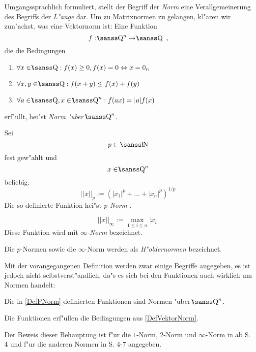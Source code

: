 Umgangssprachlich formuliert, stellt der Begriff der {\em Norm} eine 
Verallgemeinerung des Begriffs der {\em L"ange} dar. Um zu Matrixnormen 
zu gelangen, kl"aren wir zun"achst, was eine Vektornorm ist:
\MyBeginDef
{}
\label{DefVektorNorm}
    Eine Funktion
    \[ f: \Rationals^n \rightarrow \Rationals \MyKomma \]
    die die Bedingungen
    \begin{enumerate} %
    \item
         $ \forall x \in \Rationals: f(x) \geq 0, 
            f(x) = 0 \Leftrightarrow x = 0_n 
         $
    \item
         $ \forall x,y \in \Rationals: f(x + y) \leq f(x) + f(y) $
    \item
         $ \forall a \in \Rationals, x \in \Rationals^n: f(ax)= |a| f(x) $
    \end{enumerate}
    erf"ullt, hei"st {\em Norm "uber $\Rationals^n$}. 
\MyEndDef

\MyBeginDef
\label{DefPNorm}
 
    Sei \[ p \in \Nat \] 
    fest gew"ahlt und \[ x \in \Rationals^n \] beliebig.
    \[ ||x||_p := (|x_1|^p + \ldots + |x_n|^p)^{1/p} \]  
    Die so definierte Funktion hei"st { \em $p$-Norm }.

    \[ ||x||_{\infty}:= \max_{1\leq i \leq n} |x_i| \]
    Diese Funktion wird mit {\em $\infty$-Norm} bezeichnet.

    Die $p$-Normen sowie die $\infty$-Norm 
    werden als { \em H"oldernormen } bezeichnet.
\MyEndDef

Mit der vorangegangenen Definition werden zwar einige Begriffe angegeben,
es ist jedoch nicht selbstverst"andlich, da"s es sich bei den Funktionen
auch wirklich um Normen handelt:
\begin{satz}
\label{SatzPNorm}
    Die in \ref{DefPNorm} definierten Funktionen 
    sind Normen "uber $\Rationals^n$.
\end{satz}
\begin{beweis}
    Die Funktionen erf"ullen die Bedingungen aus \ref{DefVektorNorm}.

    Der Beweis dieser Behauptung ist f"ur
    die $1$-Norm, $2$-Norm und $\infty$-Norm in
    \cite{Isaa73} ab S. 4 und
    f"ur die anderen Normen in \cite{Achi67} S. 4-7 angegeben.
\end{beweis}

